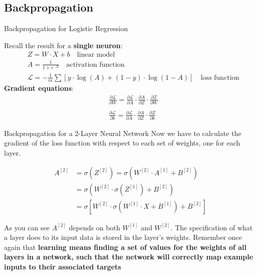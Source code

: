 \documentclass[aspectratio=169]{beamer}
\begin{document}
\subsection{Backpropagation}
%
\begin{frame}{Backpropagation for Logistic Regression}

Recall the result for a \textbf{single neuron}:
\vspace{0.1cm}
\begin{align*}
&Z = W \cdot X + b \quad \text{linear model}
\\
&A = \frac{1}{1 + e^{-Z}} \quad \text{activation function}
\\
&\mathcal{L} = -\frac{1}{m} \sum \left[ y \cdot \log(A) + (1 - y) \cdot \log(1 - A) \right] \quad \text{loss function}
\end{align*}
\textbf{Gradient equations}:
\begin{align*}
&\frac{\partial \mathcal{L}}{\partial W} = \frac{\partial \mathcal{L}}{\partial A} \cdot \frac{\partial A}{\partial Z} \cdot \frac{\partial Z}{\partial W}
\\&\\
&\frac{\partial \mathcal{L}}{\partial b} = \frac{\partial \mathcal{L}}{\partial A} \cdot \frac{\partial A}{\partial Z} \cdot \frac{\partial Z}{\partial b}
\end{align*}
\end{frame}
%
%
\begin{frame}{Backpropagation for a 2-Layer Neural Network}
Now we have to calculate the gradient of the loss function with respect to each set of weights, one for each layer. 

\begin{align*}
A^{[2]} &= \sigma\left(Z^{[2]}\right) = \sigma \left( W^{[2]} \cdot A^{[1]} + B^{[2]} \right) \\
&= \sigma \left( W^{[2]} \cdot \sigma\left({Z^{[1]}}\right) + B^{[2]} \right) \\
&= \sigma \left[ W^{[2]} \cdot \sigma\left( W^{[1]} \cdot X + B^{[1]} \right) + B^{[2]} \right]
\end{align*}

\begin{tcolorbox}
As you can see $A^{[2]}$ depends on both $W^{[1]}$ and $W^{[2]}$. The specification of what a layer does to its input data is stored in the layer's weights. Remember once again that \textbf{learning means finding a set of values for the weights of all layers in a network, such that the network will correctly map example inputs to their associated targets} 
\end{tcolorbox}
\end{frame}
\end{document}
